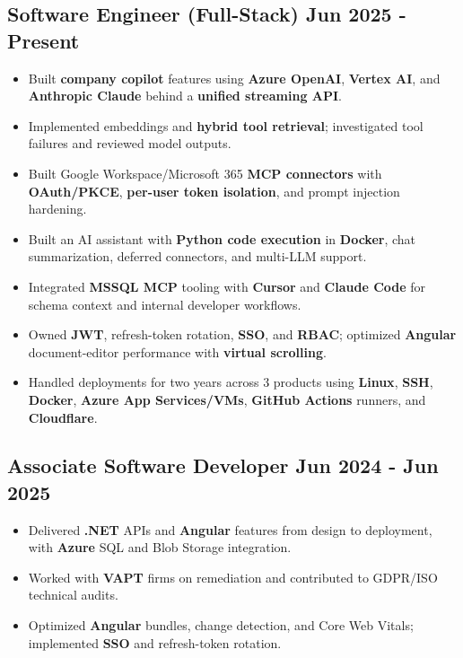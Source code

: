 \documentclass[10pt,letterpaper]{article}
\begin{document}
\subsection*{Software Engineer (Full-Stack) \hfill \normalfont\small Jun 2025 - Present}
\begin{itemize}
\item Built \textbf{company copilot} features using \textbf{Azure OpenAI}, \textbf{Vertex AI}, and \textbf{Anthropic Claude} behind a \textbf{unified streaming API}.
\item Implemented embeddings and \textbf{hybrid tool retrieval}; investigated tool failures and reviewed model outputs.
\item Built Google Workspace/Microsoft 365 \textbf{MCP connectors} with \textbf{OAuth/PKCE}, \textbf{per-user token isolation}, and prompt injection hardening.
\item Built an AI assistant with \textbf{Python code execution} in \textbf{Docker}, chat summarization, deferred connectors, and multi-LLM support.
\item Integrated \textbf{MSSQL MCP} tooling with \textbf{Cursor} and \textbf{Claude Code} for schema context and internal developer workflows.
\item Owned \textbf{JWT}, refresh-token rotation, \textbf{SSO}, and \textbf{RBAC}; optimized \textbf{Angular} document-editor performance with \textbf{virtual scrolling}.
\item Handled deployments for two years across 3 products using \textbf{Linux}, \textbf{SSH}, \textbf{Docker}, \textbf{Azure App Services/VMs}, \textbf{GitHub Actions} runners, and \textbf{Cloudflare}.
\end{itemize}
\subsection*{Associate Software Developer \hfill \normalfont\small Jun 2024 - Jun 2025}
\begin{itemize}
\item Delivered \textbf{.NET} APIs and \textbf{Angular} features from design to deployment, with \textbf{Azure} SQL and Blob Storage integration.
\item Worked with \textbf{VAPT} firms on remediation and contributed to GDPR/ISO technical audits.
\item Optimized \textbf{Angular} bundles, change detection, and Core Web Vitals; implemented \textbf{SSO} and refresh-token rotation.
\end{itemize}
\end{document}
